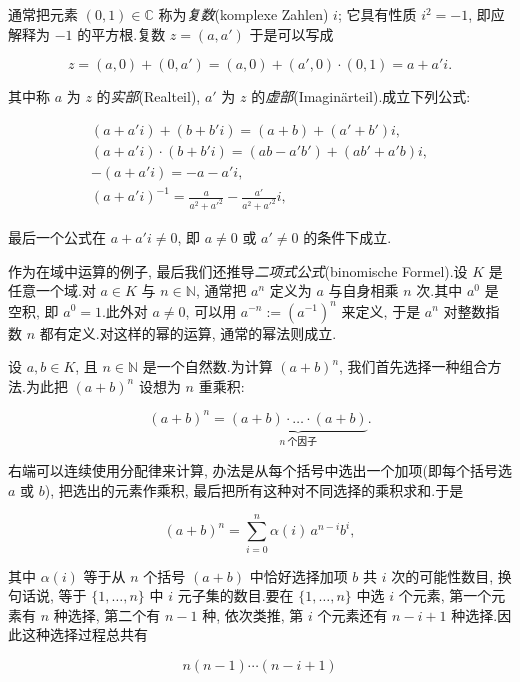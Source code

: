 通常把元素 $(0, 1) \in \mathbb{C}$ 称为\emph{复数}(\textup{komplexe Zahlen}) $i$; 它具有性质 $i^2 = -1$, 即应解释为 $-1$ 的平方根.复数 $z = (a, a')$ 于是可以写成

\[
z = (a, 0) + (0, a') = (a, 0) + (a', 0) \cdot (0, 1) = a + a'i\text{.}
\]

其中称 $a$ 为 $z$ 的\emph{实部}(\textup{Realteil}), $a'$ 为 $z$ 的\emph{虚部}(\textup{Imaginärteil}).成立下列公式:

\[
\begin{array}{c}
(a + a'i) + (b + b'i) = (a + b) + (a' + b')i, \\
(a + a'i) \cdot (b + b'i) = (ab - a'b') + (ab' + a'b)i, \\
-(a + a'i) = -a - a'i, \\
(a + a'i)^{-1} = \frac{a}{a^2 + a'^2} - \frac{a'}{a^2 + a'^2}i,
\end{array}
\]

最后一个公式在 $a + a'i \neq 0$, 即 $a \neq 0$ 或 $a' \neq 0$ 的条件下成立.

作为在域中运算的例子, 最后我们还推导\emph{二项式公式}(\textup{binomische Formel}).设 $K$ 是任意一个域.对 $a \in K$ 与 $n \in \mathbb{N}$, 通常把 $a^n$ 定义为 $a$ 与自身相乘 $n$ 次.其中 $a^0$ 是空积, 即 $a^0 = 1$.此外对 $a \neq 0$, 可以用 $a^{-n} := (a^{-1})^n$ 来定义, 于是 $a^n$ 对整数指数 $n$ 都有定义.对这样的幂的运算, 通常的幂法则成立.

设 $a, b \in K$, 且 $n \in \mathbb{N}$ 是一个自然数.为计算 $(a + b)^n$, 我们首先选择一种组合方法.为此把 $(a + b)^n$ 设想为 $n$ 重乘积:

\[
(a + b)^n = \underbrace{(a + b) \cdot \ldots \cdot (a + b)}_{n\ \text{个因子}}\text{.}
\]

右端可以连续使用分配律来计算, 办法是从每个括号中选出一个加项(即每个括号选 $a$ 或 $b$), 把选出的元素作乘积, 最后把所有这种对不同选择的乘积求和.于是

\[
(a + b)^n = \sum_{i = 0}^{n} \alpha(i)\, a^{n - i} b^{i},
\]

其中 $\alpha(i)$ 等于从 $n$ 个括号 $(a + b)$ 中恰好选择加项 $b$ 共 $i$ 次的可能性数目, 换句话说, 等于 $\{1, \ldots, n\}$ 中 $i$ 元子集的数目.要在 $\{1, \ldots, n\}$ 中选 $i$ 个元素, 第一个元素有 $n$ 种选择, 第二个有 $n - 1$ 种, 依次类推, 第 $i$ 个元素还有 $n - i + 1$ 种选择.因此这种选择过程总共有

\[
n(n - 1) \cdots (n - i + 1)
\]

